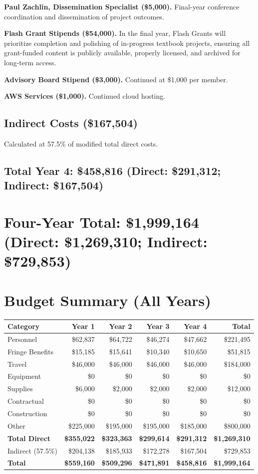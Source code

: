 \documentclass[12pt,letterpaper]{article}
\newcommand{\budgetcat}[1]{\subsection*{#1}}
\begin{document}
\textbf{Paul Zachlin, Dissemination Specialist (\$5,000).} Final-year conference coordination and dissemination of project outcomes.

\textbf{Flash Grant Stipends (\$54,000).} In the final year, Flash Grants will prioritize completion and polishing of in-progress textbook projects, ensuring all grant-funded content is publicly available, properly licensed, and archived for long-term access.

\textbf{Advisory Board Stipend (\$3,000).} Continued at \$1,000 per member.

\textbf{AWS Services (\$1,000).} Continued cloud hosting.

\budgetcat{Indirect Costs (\$167,504)}

Calculated at 57.5\% of modified total direct costs.

\budgetcat{Total Year 4: \$458,816 (Direct: \$291,312; Indirect: \$167,504)}




\section{Four-Year Total: \$1,999,164  (Direct: \$1,269,310; Indirect: \$729,853)}
\section*{Budget Summary (All Years)}

\renewcommand{\arraystretch}{1.25}
\begin{center}
\begin{tabular}{l r r r r r}
\toprule
\textbf{Category} & \textbf{Year 1} & \textbf{Year 2} & \textbf{Year 3} & \textbf{Year 4} & \textbf{Total} \\
\midrule
Personnel & \$62,837 & \$64,722 & \$46,274 & \$47,662 & \$221,495 \\
Fringe Benefits & \$15,185 & \$15,641 & \$10,340 & \$10,650 & \$51,815 \\
Travel & \$46,000 & \$46,000 & \$46,000 & \$46,000 & \$184,000 \\
Equipment & \$0 & \$0 & \$0 & \$0 & \$0 \\
Supplies & \$6,000 & \$2,000 & \$2,000 & \$2,000 & \$12,000 \\
Contractual & \$0 & \$0 & \$0 & \$0 & \$0 \\
Construction & \$0 & \$0 & \$0 & \$0 & \$0 \\
Other & \$225,000 & \$195,000 & \$195,000 & \$185,000 & \$800,000 \\
\midrule
\textbf{Total Direct} & \textbf{\$355,022} & \textbf{\$323,363} & \textbf{\$299,614} & \textbf{\$291,312} & \textbf{\$1,269,310} \\
Indirect (57.5\%) & \$204,138 & \$185,933 & \$172,278 & \$167,504 & \$729,853 \\
\textbf{Total} & \textbf{\$559,160} & \textbf{\$509,296} & \textbf{\$471,891} & \textbf{\$458,816} & \textbf{\$1,999,164} \\
\bottomrule
\end{tabular}
\end{center}
\end{document}
